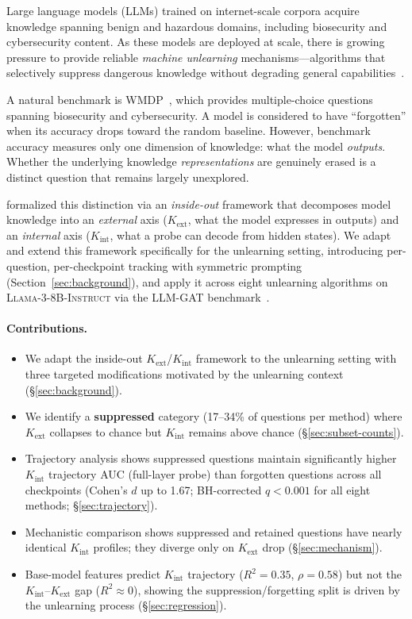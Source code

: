 \documentclass[11pt]{article}
\begin{document}
Large language models (LLMs) trained on internet-scale corpora acquire knowledge
spanning benign and hazardous domains, including biosecurity and cybersecurity
content.
As these models are deployed at scale, there is growing pressure to provide
reliable \emph{machine unlearning} mechanisms---algorithms that selectively
suppress dangerous knowledge without degrading general
capabilities~\citep{dorna2025openunlearning}.

A natural benchmark is WMDP~\citep{li2024wmdp}, which provides multiple-choice
questions spanning biosecurity and cybersecurity.
A model is considered to have ``forgotten'' when its accuracy drops toward the
random baseline.
However, benchmark accuracy measures only one dimension of knowledge: what the
model \emph{outputs}.
Whether the underlying knowledge \emph{representations} are genuinely erased is
a distinct question that remains largely unexplored.

\citet{gekhman2025insideout} formalized this distinction via an \emph{inside-out}
framework that decomposes model knowledge into an \emph{external} axis
($K_\text{ext}$, what the model expresses in outputs) and an \emph{internal}
axis ($K_\text{int}$, what a probe can decode from hidden states).
We adapt and extend this framework specifically for the unlearning setting,
introducing per-question, per-checkpoint tracking with symmetric prompting
(Section~\ref{sec:background}), and apply it across eight unlearning algorithms
on \textsc{Llama-3-8B-Instruct} via the LLM-GAT
benchmark~\citep{che2025model,llmgat2024}.

\paragraph{Contributions.}
\begin{itemize}[leftmargin=1.5em, itemsep=2pt]
    \item We adapt the inside-out $K_\text{ext}$/$K_\text{int}$ framework to the
    unlearning setting with three targeted modifications motivated by the
    unlearning context (\S\ref{sec:background}).
    \item We identify a \textbf{suppressed} category (17--34\% of questions per
    method) where $K_\text{ext}$ collapses to chance but $K_\text{int}$ remains
    above chance (\S\ref{sec:subset-counts}).
    \item Trajectory analysis shows suppressed questions maintain significantly
    higher $K_\text{int}$ trajectory AUC (full-layer probe) than forgotten questions
    across all checkpoints (Cohen's $d$ up to 1.67; BH-corrected $q < 0.001$ for
    all eight methods; \S\ref{sec:trajectory}).
    \item Mechanistic comparison shows suppressed and retained questions have
    nearly identical $K_\text{int}$ profiles; they diverge only on $K_\text{ext}$
    drop (\S\ref{sec:mechanism}).
    \item Base-model features predict $K_\text{int}$ trajectory
    ($R^2 = 0.35$, $\rho = 0.58$) but not the $K_\text{int}$--$K_\text{ext}$ gap
    ($R^2\approx 0$), showing the suppression/forgetting split is driven by the
    unlearning process (\S\ref{sec:regression}).
\end{itemize}
\end{document}
